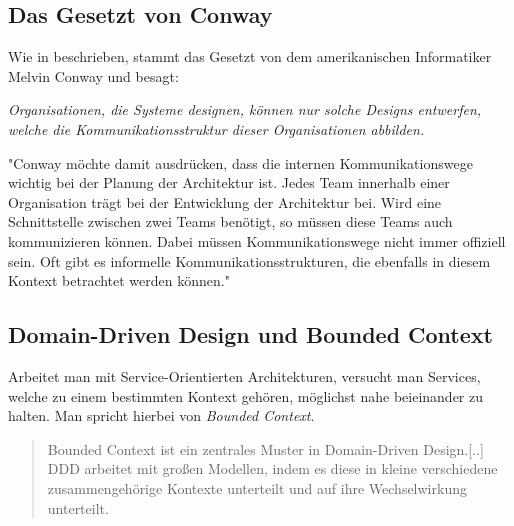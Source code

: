 \subsection{Das Gesetzt von Conway}
\label{subsec:conway}
Wie in \cite[S. 39 ff.]{EWolff2016:Microservices} beschrieben, stammt das Gesetzt von dem amerikanischen Informatiker Melvin Conway und besagt:
\begin{center}
    \textit{Organisationen, die Systeme designen, können nur solche Designs entwerfen, welche die Kommunikationsstruktur dieser Organisationen abbilden.}
\end{center}
"Conway möchte damit ausdrücken, dass die internen Kommunikationswege wichtig bei der Planung der Architektur ist. Jedes Team innerhalb einer Organisation trägt bei der Entwicklung der Architektur bei. Wird eine Schnittstelle zwischen zwei Teams benötigt, so müssen diese Teams auch kommunizieren können. Dabei müssen Kommunikationswege nicht immer offiziell sein. Oft gibt es informelle Kommunikationsstrukturen, die ebenfalls in diesem Kontext betrachtet werden können." \cite[vg. S. 39]{EWolff2016:Microservices}

\subsection{Domain-Driven Design und Bounded Context}
\label{sec:boundedContext}
Arbeitet man mit Service-Orientierten Architekturen, versucht man Services, welche zu einem bestimmten Kontext gehören, möglichst nahe beieinander zu halten. Man spricht hierbei von \textit{Bounded Context}. 
\begin{quotation}
    \frqq Bounded Context ist ein zentrales Muster in Domain-Driven Design.[..] DDD arbeitet mit großen Modellen, indem es diese in kleine verschiedene zusammengehörige Kontexte unterteilt und auf ihre Wechselwirkung unterteilt.\flqq \cite{mfowler:BoundedContext}
\end{quotation}

